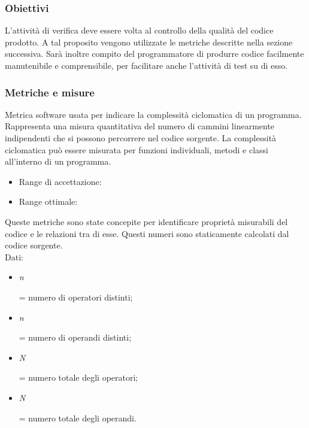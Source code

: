 \documentclass[a4paper,11pt]{article}
\begin{document}
\subsubsection{Obiettivi}
L'attività di verifica deve essere volta al controllo della qualità del codice prodotto. A tal proposito vengono utilizzate le metriche descritte nella sezione successiva. Sarà inoltre compito del programmatore di produrre codice facilmente manutenibile e comprensibile, per facilitare anche l'attività di test su di esso.
\subsubsection{Metriche e misure}
Metrica software usata per indicare la complessità ciclomatica di un programma. Rappresenta una misura quantitativa del numero di cammini linearmente indipendenti che si possono percorrere nel codice sorgente.  
La complessità ciclomatica può essere misurata per funzioni individuali, metodi e classi all'interno di un programma.
\begin{itemize}
	\item Range di accettazione: \begin{math}[0 - 15]\end{math}
	\item Range ottimale: \begin{math}[0 - 10]\end{math}
	\end{itemize}
 Queste metriche sono state concepite per identificare proprietà misurabili del codice e le relazioni tra di esse. Questi numeri sono staticamente calcolati dal codice sorgente.\\
Dati: 
\begin{itemize}
\item \textit{n}\begin{tiny}{} \end{tiny} = numero di operatori distinti;
\item \textit{n}\begin{tiny}{} \end{tiny} = numero di operandi distinti;
\item \textit{N}\begin{tiny}{} \end{tiny} = numero totale degli operatori;
\item \textit{N}\begin{tiny}{} \end{tiny} = numero totale degli operandi.
\end{itemize}
\end{document}
